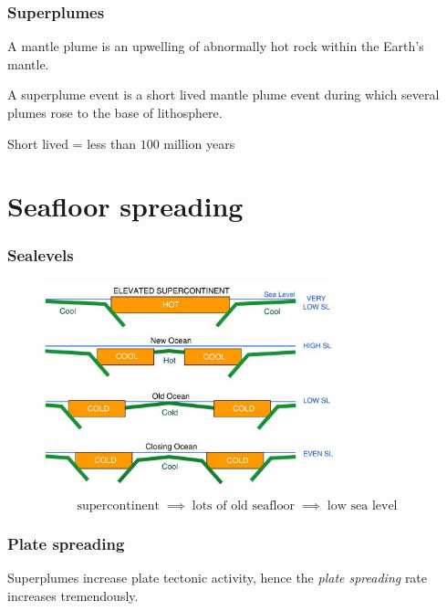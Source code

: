 \documentclass{beamer}
\begin{document}
        \begin{frame}
        \frametitle{Superplumes}
        A \alert{mantle plume} is an upwelling of abnormally hot rock within the Earth's mantle.

        A \alert{superplume} event is a short lived mantle plume event during which several plumes rose to the base of lithosphere.
        \pause

        \begin{center}
        Short lived = less than $100$ million years
        \end{center}
        \end{frame}

        \section{Seafloor spreading}
        
        \begin{frame}
        \frametitle{Sealevels}
        \begin{figure}
        \begin{center}
                \includegraphics[width=0.75\textwidth]{seafloor.png}
        \end{center}
        \end{figure}
        \[
        \text{supercontinent} \;\implies\; \text{lots of old seafloor} \;\implies\; \text{low sea level}
        \]
        \end{frame}
        \begin{frame}
        \frametitle{Plate spreading}
        \begin{figure}[h!]
                \centering    
        \end{figure}  

        Superplumes increase plate tectonic activity, hence the \emph{plate spreading} rate increases tremendously.
        \end{frame}
        
\end{document}
